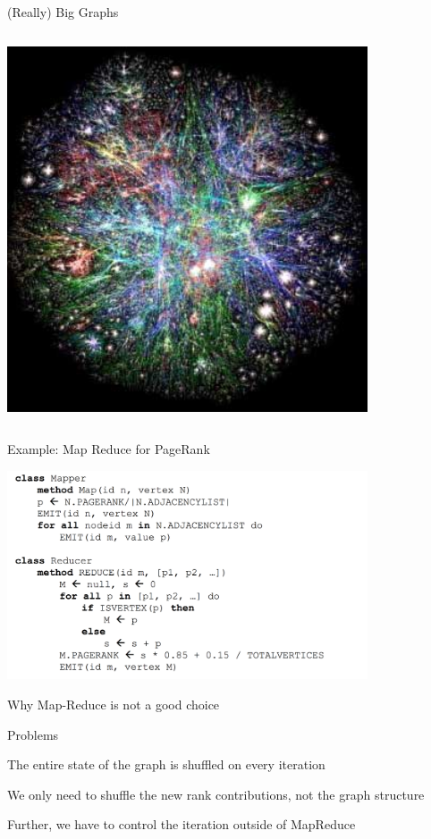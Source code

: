 \begin{frame}{(Really) Big Graphs}
\begin{columns}[T]
\begin{column}{0.4\textwidth}
\begin{center}
\includegraphics[width=0.80\textwidth]{figs/xx/web.jpg}
\end{center}
\end{column}
\end{columns}
	
\end{frame}

	
	
\begin{frame}{Example: Map Reduce for PageRank}	

\includegraphics[width=0.8\textwidth]{figs/xx/mapreduce.png}

\end{frame}

\begin{frame}{Why Map-Reduce is not a good choice}	

Problems
\BI
\item The entire state of the graph is shuffled on every iteration
\item We only need to shuffle the new rank contributions, not the graph structure
\item Further, we have to control the iteration outside of MapReduce
\EI

\end{frame}

